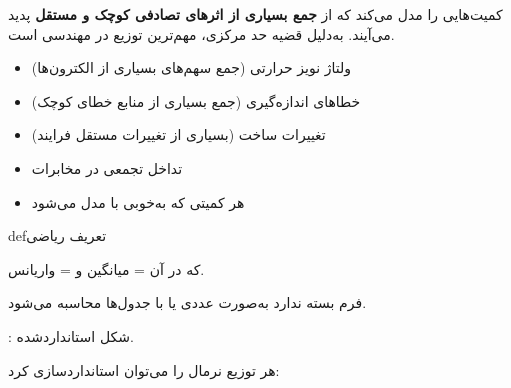 

کمیت‌هایی را مدل می‌کند که از \textbf{جمع بسیاری از اثرهای تصادفی کوچک و مستقل} پدید می‌آیند. به‌دلیل قضیه حد مرکزی، مهم‌ترین توزیع در مهندسی است.


\begin{itemize}
\tightlist
\item
  ولتاژ نویز حرارتی (جمع سهم‌های بسیاری از الکترون‌ها)
\item
  خطاهای اندازه‌گیری (جمع بسیاری از منابع خطای کوچک)
\item
  تغییرات ساخت (بسیاری از تغییرات مستقل فرایند)
\item
  تداخل تجمعی در مخابرات
\item
  هر کمیتی که به‌خوبی با  مدل می‌شود
\end{itemize}

\begin{PSbox}[unbreakable]{def}{تعریف ریاضی}

 که در آن \lr{$\mu$} = میانگین و  = واریانس.

\end{PSbox}





فرم بسته ندارد  به‌صورت عددی یا با جدول‌ها محاسبه می‌شود.






: شکل استانداردشده.

هر توزیع نرمال را می‌توان استانداردسازی کرد: 


